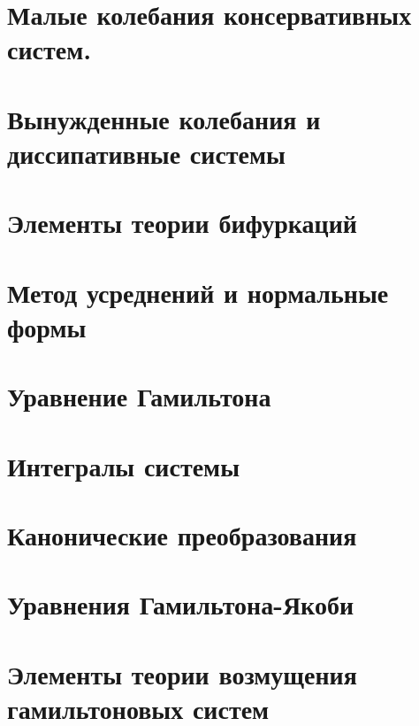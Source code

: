 


\section{Малые колебания консервативных систем.}


\section{Вынужденные колебания и диссипативные системы}


\section{Элементы теории бифуркаций}


\section{Метод усреднений и нормальные формы}


\section{Уравнение Гамильтона}


\section{Интегралы системы}


\section{Канонические преобразования}


\section{Уравнения Гамильтона-Якоби}


% 

\section{Элементы теории возмущения гамильтоновых систем}







   
 



